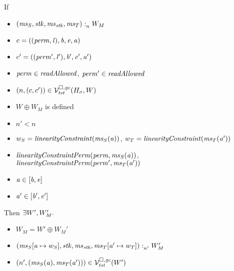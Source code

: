 \begin{lemma}
  \label{lem:readcond-cap-works}
  If
  \begin{itemize}
  \item $\memSat{(\ms_S,\stk,\ms_\stk,\ms_T)}{W_M}$
  \item $c = ((\perm,\lin),\baddr,\eaddr,\aaddr)$
  \item $c' = ((\perm',\lin'),\baddr',\eaddr',\aaddr')$
  \item $\perm \in \readAllowed{}$, $\perm' \in \readAllowed{}$
  \item $\npair{(c,c')}\in\lrvg{\trust}(H_\sigma,W)$
  \item $W \oplus W_M$ is defined
  \item $n' < n$
  \item $w_S = \linCons{\ms_S(\aaddr)}$, $w_T = \linCons{\ms_T(\aaddr')}$
  \item $\linConsPerm{\perm}{\ms_S(\aaddr)}$, $\linConsPerm{\perm'}{\ms_T(\aaddr')}$
  \item $\aaddr \in [\baddr,\eaddr]$
  \item $\aaddr' \in [\baddr',\eaddr']$
  \end{itemize}
  Then $\exists W', W_M'\ldotp$
  \begin{itemize}
  \item $W_M = W' \oplus W_M'$
  \item $\memSat[n']{(\ms_S\update{\aaddr}{w_S},\stk,\ms_\stk,\ms_T\update{\aaddr'}{w_T})}{W_M'}$
  \item $\npair[n']{(\ms_S(\aaddr),\ms_T(\aaddr'))} \in \lrvg{\trust}(W')$
  \end{itemize}
\end{lemma}
